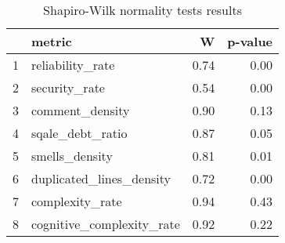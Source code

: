 \begin{table}[ht]
\centering
\begin{tabular}{rlrr}
  \hline
 & metric & W & p-value \\ 
  \hline
1 & reliability\_rate & 0.74 & 0.00 \\ 
  2 & security\_rate & 0.54 & 0.00 \\ 
  3 & comment\_density & 0.90 & 0.13 \\ 
  4 & sqale\_debt\_ratio & 0.87 & 0.05 \\ 
  5 & smells\_density & 0.81 & 0.01 \\ 
  6 & duplicated\_lines\_density & 0.72 & 0.00 \\ 
  7 & complexity\_rate & 0.94 & 0.43 \\ 
  8 & cognitive\_complexity\_rate & 0.92 & 0.22 \\ 
   \hline
\end{tabular}
\caption{Shapiro-Wilk normality tests results} 
\label{tab:normalityTestrewarding}
\end{table}
